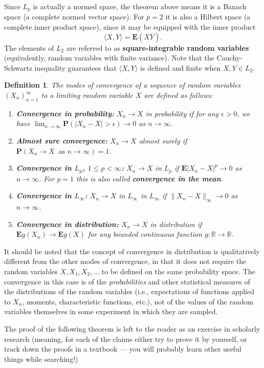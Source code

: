 \documentclass[12pt]{article}
\newtheorem{defi}[thm]{Definition}
\newcommand{\R}{\mathbb{R}}
\newcommand{\prob}{\mathbf{P}}
\newcommand{\expec}{\mathbf{E}}
\theoremstyle{example}
\begin{document}
Since $L_p$ is actually a normed space, the theorem above means it is a Banach space (a complete normed vector space). For $p=2$ it is also a Hilbert space (a complete inner product space), since it may be equipped with the inner product
$$ \langle X,Y\rangle = \expec(X\overline{Y}). $$
The elements of $L_2$ are referred to as \textbf{square-integrable random variables} (equivalently, random variables with finite variance). Note that the Cauchy-Schwartz inequality guarantees that $\langle X,Y\rangle$ is defined and finite when $X,Y\in L_2$.


\begin{defi} The modes of convergence of a sequence of random variables $(X_n)_{n=1}^\infty$ to a limiting random variable $X$ are defined as follows:
\begin{enumerate}
\item \textbf{Convergence in probability:} $X_n \to X$ in probability if for any $\epsilon>0$, we have $\lim_{n\to\infty} \prob(|X_n-X|>\epsilon)\to 0$ as $n\to\infty$.
\item \textbf{Almost sure convergence:} $X_n\to X$ almost surely if $\prob(X_n\to X\ \textrm{ as }n\to\infty) = 1$.
\item \textbf{Convergence in $L_p$, $1\le p<\infty$:} $X_n\to X$ in $L_p$ if $\expec|X_n-X|^p \to 0$ as $n\to\infty$. For $p=1$ this is also called \textbf{convergence in the mean}.
\item \textbf{Convergence in $L_\infty$:} $X_n\to X$ in $L_\infty$ in $L_\infty$ if $\lVert X_n-X\rVert_\infty\to 0$ as $n\to\infty$.
\item \textbf{Convergence in distribution:} $X_n\to X$ in distribution if $\expec g(X_n)\to \expec g(X)$ for any bounded continuous function $g:\R\to\R$.
\end{enumerate}
\end{defi}

It should be noted that the concept of convergence in distribution is qualitatively different from the other modes of convergence, in that it does not require the random variables $X, X_1, X_2, \ldots$ to be defined on the same probability space. The convergence in this case is of the \emph{probabilities} and other statistical measures of the distributions of the random variables (i.e., expectations of functions applied to $X_n$, moments, characteristic functions, etc.), not of the values of the random variables themselves in some experiment in which they are sampled.

The proof of the following theorem is left to the reader as an exercise in scholarly research (meaning, for each of the claims either try to prove it by yourself, or track down the proofs in a textbook --- you will probably learn other useful things while searching!)
\end{document}
